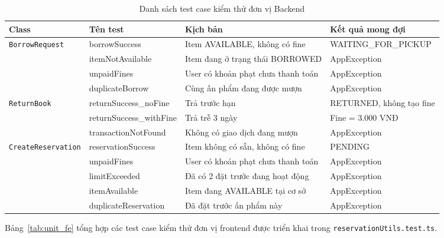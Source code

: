 \begin{table}[h]
\centering
\caption{Danh sách test case kiểm thử đơn vị Backend}
\label{tab:unit_be}
\begin{tabular}{|l|p{4cm}|p{4cm}|l|}
\hline
\textbf{Class} & \textbf{Tên test} & \textbf{Kịch bản} & \textbf{Kết quả mong đợi} \\
\hline
\multirow{4}{*}{\texttt{BorrowRequest}}
  & borrowSuccess & Item AVAILABLE, không có fine & WAITING\_FOR\_PICKUP \\
\cline{2-4}
  & itemNotAvailable & Item đang ở trạng thái BORROWED & AppException \\
\cline{2-4}
  & unpaidFines & User có khoản phạt chưa thanh toán & AppException \\
\cline{2-4}
  & duplicateBorrow & Cùng ấn phẩm đang được mượn & AppException \\
\hline
\multirow{3}{*}{\texttt{ReturnBook}}
  & returnSuccess\_noFine & Trả trước hạn & RETURNED, không tạo fine \\
\cline{2-4}
  & returnSuccess\_withFine & Trả trễ 3 ngày & Fine = 3.000 VNĐ \\
\cline{2-4}
  & transactionNotFound & Không có giao dịch đang mượn & AppException \\
\hline
\multirow{5}{*}{\texttt{CreateReservation}}
  & reservationSuccess & Item không có sẵn, không có fine & PENDING \\
\cline{2-4}
  & unpaidFines & User có khoản phạt chưa thanh toán & AppException \\
\cline{2-4}
  & limitExceeded & Đã có 2 đặt trước đang hoạt động & AppException \\
\cline{2-4}
  & itemAvailable & Item đang AVAILABLE tại cơ sở & AppException \\
\cline{2-4}
  & duplicateReservation & Đã đặt trước ấn phẩm này & AppException \\
\hline
\end{tabular}
\end{table}

Bảng~\ref{tab:unit_fe} tổng hợp các test case kiểm thử đơn vị frontend được triển
khai trong \texttt{reservationUtils.test.ts}.

